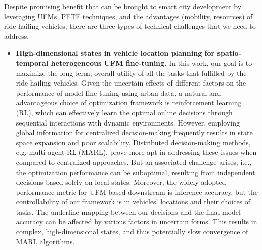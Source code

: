 Despite promising benefit that can be brought to smart city development by leveraging UFMs, PETF techniques, and the advantages (mobility, resources) of ride-hailing vehicles, there are three types of technical challenges that we need to address. 

\begin{itemize}
\item{{\bf High-dimensional states in vehicle location planning for spatio-temporal heterogeneous UFM fine-tuning.} 
In this work, our goal is to maximize the long-term, overall utility of all the tasks that fulfilled by the ride-hailing vehicles. Given the uncertain effects of different factors on the performance of model fine-tuning using urban data, a natural and advantageous choice of optimization framework is reinforcement learning (RL), which can effectively learn the optimal online decisions through sequential interactions with dynamic environments.
However, employing global information for centralized decision-making frequently results in state space expansion and poor scalability. Distributed decision-making methods, e.g, multi-agent RL (MARL), prove more apt in addressing these issues when compared to centralized approaches. But an associated challenge arises, i.e., the optimization performance can be suboptimal, resulting from independent decisions based solely on local states. Moreover, the widely adopted performance metric for UFM-based downstream is inference accuracy, but the controllability of our framework is in vehicles' locations and their choices of tasks. The underline mapping between our decisions and the final model accuracy can be affected by various factors in uncertain forms. This results in complex, high-dimensional states, and thus potentially slow convergence of MARL algorithms.} %


\end{itemize}
